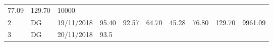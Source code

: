 \documentclass[
  11pt,
]{article}
\begin{document}
\begin{longtable}[]{@{}llllllllll@{}}
\begin{minipage}[t]{0.06\columnwidth}
77.09\strut
\end{minipage} & \begin{minipage}[t]{0.13\columnwidth}\raggedright
129.70\strut
\end{minipage} & \begin{minipage}[t]{0.08\columnwidth}\raggedright
10000\strut
\end{minipage}\tabularnewline
\begin{minipage}[t]{0.04\columnwidth}\raggedright
2\strut
\end{minipage} & \begin{minipage}[t]{0.09\columnwidth}\raggedright
DG\strut
\end{minipage} & \begin{minipage}[t]{0.10\columnwidth}\raggedright
19/11/2018\strut
\end{minipage} & \begin{minipage}[t]{0.06\columnwidth}\raggedright
95.40\strut
\end{minipage} & \begin{minipage}[t]{0.06\columnwidth}\raggedright
92.57\strut
\end{minipage} & \begin{minipage}[t]{0.06\columnwidth}\raggedright
64.70\strut
\end{minipage} & \begin{minipage}[t]{0.06\columnwidth}\raggedright
45.28\strut
\end{minipage} & \begin{minipage}[t]{0.06\columnwidth}\raggedright
76.80\strut
\end{minipage} & \begin{minipage}[t]{0.13\columnwidth}\raggedright
129.70\strut
\end{minipage} & \begin{minipage}[t]{0.08\columnwidth}\raggedright
9961.09\strut
\end{minipage}\tabularnewline
\begin{minipage}[t]{0.04\columnwidth}\raggedright
3\strut
\end{minipage} & \begin{minipage}[t]{0.09\columnwidth}\raggedright
DG\strut
\end{minipage} & \begin{minipage}[t]{0.10\columnwidth}\raggedright
20/11/2018\strut
\end{minipage} & \begin{minipage}[t]{0.06\columnwidth}\raggedright
93.5\strut
\end{minipage} & \begin{minipage}[t]{0.06\columnwidth}\raggedright

\end{minipage}
\end{longtable}
\end{document}
